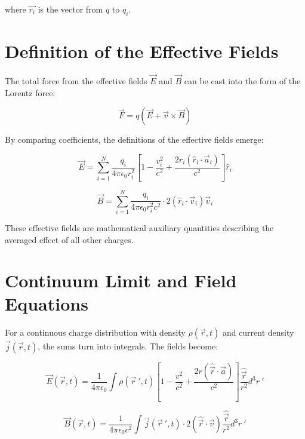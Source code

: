 where $\vec{r_i}$ is the vector from $q$ to $q_i$.

\section{Definition of the Effective Fields}
The total force from the effective fields $\vec{E}$ and $\vec{B}$ can be cast into the form of the Lorentz force:

\begin{equation}
    \label{eq:lorentz_kraft}
    \vec{F} = q \left( \vec{E} + \vec{v} \times \vec{B} \right)
\end{equation}

By comparing coefficients, the definitions of the effective fields emerge:

\begin{equation}
    \vec{E} = \sum_{i=1}^N \frac{q_i}{4\pi\epsilon_0 r_i^2} \left[ 1 - \frac{v_i^2}{c^2} + \frac{2r_i(\hat{r}_i\cdot\vec{a}_i)}{c^2} \right] \hat{r}_i
\end{equation}

\begin{equation}
    \vec{B} = \sum_{i=1}^N \frac{q_i}{4\pi\epsilon_0 r_i^2 c^2} \cdot 2(\hat{r}_i\cdot\vec{v}_i) \vec{v}_i
\end{equation}

These effective fields are mathematical auxiliary quantities describing the averaged effect of all other charges.

\section{Continuum Limit and Field Equations}
\label{sec:kontinuumslimes}
For a continuous charge distribution with density $\rho(\vec{r}, t)$ and current density $\vec{j}(\vec{r},t)$, the sums turn into integrals. The fields become:

\begin{equation}
    \vec{E}(\vec{r}, t) = \frac{1}{4\pi\epsilon_0} \int \rho(\vec{r}~', t) \left[ 1 - \frac{v^2}{c^2} + \frac{2r(\hat{\vec{r}}\cdot\vec{a})}{c^2} \right] \frac{\hat{\vec{r}}}{r^2}  d^3r~'
\end{equation}

\begin{equation}
    \vec{B}(\vec{r}, t) = \frac{1}{4\pi\epsilon_0 c^2} \int \vec{j}(\vec{r}~', t) \cdot 2(\hat{\vec{r}}\cdot\vec{v}) \frac{\hat{\vec{r}}}{r^2}  d^3r~'
\end{equation}

